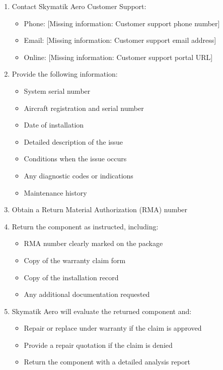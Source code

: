 \documentclass[12pt,a4paper,twoside,openright]{book}
\begin{document}
\begin{enumerate}
    \item Contact Skymatik Aero Customer Support:
    \begin{itemize}
        \item Phone: {\color{missingred}[Missing information: Customer support phone number]}
        \item Email: {\color{missingred}[Missing information: Customer support email address]}
        \item Online: {\color{missingred}[Missing information: Customer support portal URL]}
    \end{itemize}
    
    \item Provide the following information:
    \begin{itemize}
        \item System serial number
        \item Aircraft registration and serial number
        \item Date of installation
        \item Detailed description of the issue
        \item Conditions when the issue occurs
        \item Any diagnostic codes or indications
        \item Maintenance history
    \end{itemize}
    
    \item Obtain a Return Material Authorization (RMA) number
    
    \item Return the component as instructed, including:
    \begin{itemize}
        \item RMA number clearly marked on the package
        \item Copy of the warranty claim form
        \item Copy of the installation record
        \item Any additional documentation requested
    \end{itemize}
    
    \item Skymatik Aero will evaluate the returned component and:
    \begin{itemize}
        \item Repair or replace under warranty if the claim is approved
        \item Provide a repair quotation if the claim is denied
        \item Return the component with a detailed analysis report
    \end{itemize}
\end{enumerate}
\end{document}
